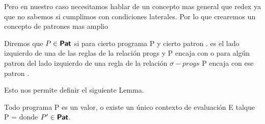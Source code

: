 Pero en nuestro caso necesitamos hablar de un concepto mas general que redex ya que no sabemos si cumplimos con condiciones laterales.
Por lo que crearemos un concepto de patrones mas amplio

\begin{definition}
    Diremos que $P \in \textsf{\textbf{Pat}}$ si para cierto programa P y cierto patron .  es el lado izquierdo de una de las reglas de la relación progs y P encaja con 
    o para algún patron  del lado izquierdo de una regla de la relación $\sigma-progs$ P encaja con ese patron .
\end{definition}

Esto nos permite definir el siguiente Lemma.

\begin{lemma}
    Todo programa P es un valor, o existe un único contexto de evaluación E talque 
    P =  donde $P' \in \textsf{\textbf{Pat}}$.
\end{lemma}

